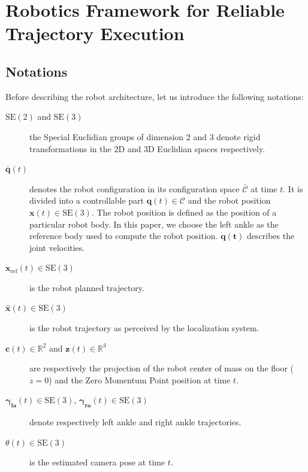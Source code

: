 \section{Robotics Framework for Reliable Trajectory Execution}\label{sec:architecture}

\subsection{Notations}
Before describing the robot architecture, let us introduce the following notations:

\begin{description}
\item[$\text{SE}(2)$ and $\text{SE}(3)$]\hspace{1.45cm} the Special Euclidian groups of dimension 2 and 3 denote rigid transformations in the 2D and 3D Euclidian spaces respectively.
\item[$\mathbf{\bar{q}}(t)$] denotes the robot configuration in its configuration space $\mathcal{\bar{C}}$ at time $t$. It is divided into a controllable part $\mathbf{q}(t) \in \mathcal{C}$ and the robot position $\mathbf{x}(t) \in \text{SE}(3)$. The robot position is defined as the position of a particular robot body. In this paper, we choose the left ankle as the reference body used to compute the robot position. $\mathbf{\dot{q}(t)}$ describes the joint velocities.
\item[$\mathbf{x}_{\text{ref}}(t) \in \text{SE}(3)$] \hspace{1.2cm} is the robot planned trajectory.
\item[$\mathbf{\hat{x}}(t) \in \text{SE}(3)$] \hspace{.8cm} is the robot trajectory as perceived by the localization system.
\item[$\mathbf{c}(t) \in \mathbb{R}^2$ and $\mathbf{z}(t) \in
  \mathbb{R}^3$]\hspace{2.6cm} are respectively the projection of the robot center of mass on the floor ($z = 0$) and the Zero Momentum Point position at time $t$.
\item[$\mathbf{\gamma_{\text{la}}}(t) \in \text{SE}(3)$, $\mathbf{\gamma_{\text{ra}}}(t)
  \in \text{SE}(3)$]\hspace{3.4cm} denote respectively left ankle and right ankle trajectories.
\item[$\theta(t) \in \text{SE}(3)$]\hspace{0.8cm} is the estimated camera pose at time $t$.
\end{description}

